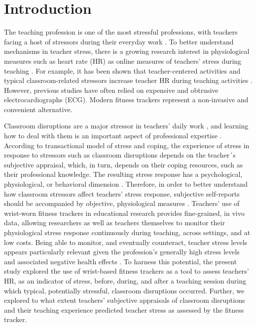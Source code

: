 \documentclass[preprint, 3p,
sort,]{elsarticle} %
\begin{document}
\section{Introduction}\label{introduction}

The teaching profession is one of the most stressful professions, with
teachers facing a host of stressors during their everyday work
\citep{smith2000, herman2020, schult2014belastet}. To better understand
mechanisms in teacher stress, there is a growing research interest in
physiological measures such as heart rate (HR) as online measures of
teachers' stress during teaching
\citep{karner2021teachers, wettstein2020ambulatory}. For example, it has
been shown that teacher-centered activities and typical
classroom-related stressors increase teacher HR during teaching
activities
\citep{sperka1995, scheuch1997psychophysische, donker2018, junker2021, huang2022class}.
However, previous studies have often relied on expensive and obtrusive
electrocardiographs (ECG). Modern fitness trackers represent a
non-invasive and convenient alternative. \citep{ferguson2015}

Classroom disruptions are a major stressor in teachers' daily work
\citep{boyle1995structural, aloe2014multivariate}, and learning how to
deal with them is an important aspect of professional expertise
\citep{wolff2015keeping}. According to \citet{lazarus1990theory}
transactional model of stress and coping, the experience of stress in
response to stressors such as classroom disruptions depends on the
teacher´s subjective appraisal, which, in turn, depends on their coping
resources, such as their professional knowledge. The resulting stress
response has a psychological, physiological, or behavioral dimension
\citep{kyriacou1978}. Therefore, in order to better understand how
classroom stressors affect teachers' stress response, subjective
self-reports should be accompanied by objective, physiological measures
\citep{wettstein2021}. Teachers' use of wrist-worn fitness trackers in
educational research provides fine-grained, in vivo data, allowing
researchers as well as teachers themselves to monitor their
physiological stress response continuously during teaching, across
settings, and at low costs. Being able to monitor, and eventually
counteract, teacher stress levels appears particularly relevant given
the profession's generally high stress levels and associated negative
health effects \citep{johnson2005experience, montgomery2005meta}. To
harness this potential, the present study explored the use of
wrist-based fitness trackers as a tool to assess teachers' HR, as an
indicator of stress, before, during, and after a teaching session during
which typical, potentially stressful, classroom disruptions occurred.
Further, we explored to what extent teachers' subjective appraisals of
classroom disruptions and their teaching experience predicted teacher
stress as assessed by the fitness tracker.
\end{document}
